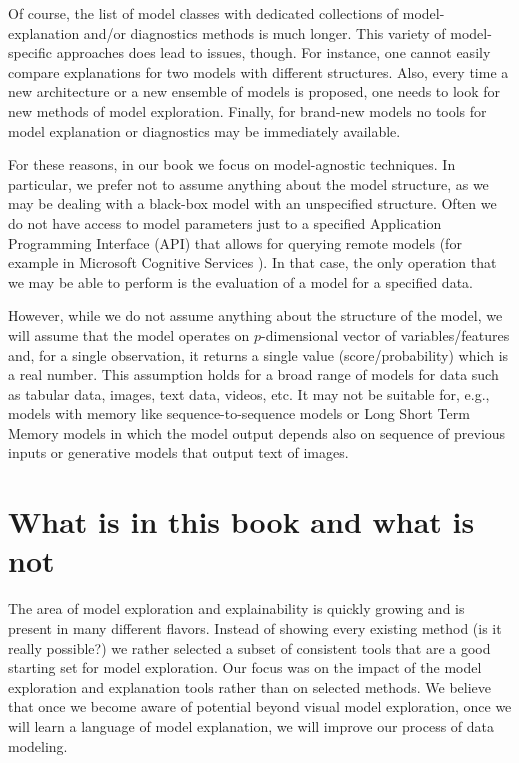 \documentclass[]{krantz}
\begin{document}
Of course, the list of model classes with dedicated collections of model-explanation and/or diagnostics methods is much longer. This variety of model-specific approaches does lead to issues, though. For instance, one cannot easily compare explanations for two models with different structures. Also, every time a new architecture or a new ensemble of models is proposed, one needs to look for new methods of model exploration. Finally, for brand-new models no tools for model explanation or diagnostics may be immediately available.

For these reasons, in our book we focus on model-agnostic techniques. In particular, we prefer not to assume anything about the model structure, as we may be dealing with a black-box model with an unspecified structure. Often we do not have access to model parameters just to a specified Application Programming Interface (API) that allows for querying remote models (for example in Microsoft Cognitive Services \citep{MicrosofrCognitiveServices}).
In that case, the only operation that we may be able to perform is the evaluation of a model for a specified data.

However, while we do not assume anything about the structure of the model, we will assume that the model operates on \(p\)-dimensional vector of variables/features and, for a single observation, it returns a single value (score/probability) which is a real number. This assumption holds for a broad range of models for data such as tabular data, images, text data, videos, etc. It may not be suitable for, e.g., models with memory like sequence-to-sequence models \citep{seq2seq} or Long Short Term Memory models \citep{lstm} in which the model output depends also on sequence of previous inputs or generative models that output text of images.

\hypertarget{what-is-in-this-book-and-what-is-not}{%
\section{What is in this book and what is not}\label{what-is-in-this-book-and-what-is-not}}

The area of model exploration and explainability is quickly growing and is present in many different flavors. Instead of showing every existing method (is it really possible?) we rather selected a subset of consistent tools that are a good starting set for model exploration. Our focus was on the impact of the model exploration and explanation tools rather than on selected methods. We believe that once we become aware of potential beyond visual model exploration, once we will learn a language of model explanation, we will improve our process of data modeling.
\end{document}
